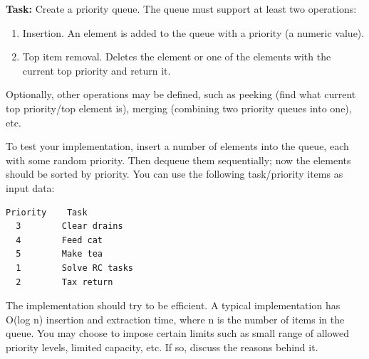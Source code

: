 \textbf{Task:} Create a priority queue. The queue must support at least
two operations:

\begin{enumerate}
\item
  Insertion. An element is added to the queue with a priority (a numeric
  value).
\item
  Top item removal. Deletes the element or one of the elements with the
  current top priority and return it.
\end{enumerate}

Optionally, other operations may be defined, such as peeking (find what
current top priority/top element is), merging (combining two priority
queues into one), etc.

To test your implementation, insert a number of elements into the queue,
each with some random priority. Then dequeue them sequentially; now the
elements should be sorted by priority. You can use the following
task/priority items as input data:

\begin{verbatim}
Priority    Task
  3        Clear drains
  4        Feed cat
  5        Make tea
  1        Solve RC tasks
  2        Tax return
\end{verbatim}

The implementation should try to be efficient. A typical implementation
has O(log n) insertion and extraction time, where n is the number of
items in the queue. You may choose to impose certain limits such as
small range of allowed priority levels, limited capacity, etc. If so,
discuss the reasons behind it.



